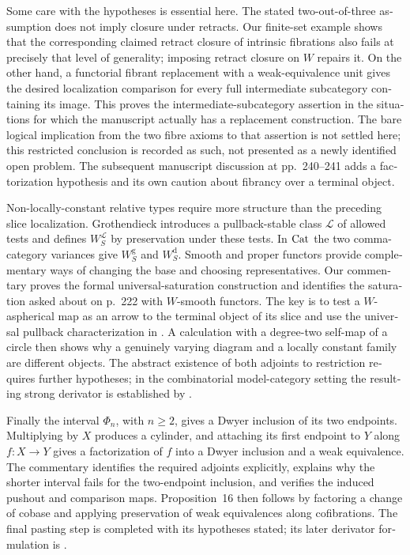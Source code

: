 \begin{otherlanguage}{english}
Some care with the hypotheses is essential here. The stated two-out-of-three assumption does not imply closure under retracts. Our finite-set example shows that the corresponding claimed retract closure of intrinsic fibrations also fails at precisely that level of generality; imposing retract closure on $W$ repairs it. On the other hand, a functorial fibrant replacement with a weak-equivalence unit gives the desired localization comparison for every full intermediate subcategory containing its image. This proves the intermediate-subcategory assertion in the situations for which the manuscript actually has a replacement construction. The bare logical implication from the two fibre axioms to that assertion is not settled here; this restricted conclusion is recorded as such, not presented as a newly identified open problem. The subsequent manuscript discussion at pp.~240--241 adds a factorization hypothesis and its own caution about fibrancy over a terminal object.

Non-locally-constant relative types require more structure than the preceding slice localization. Grothendieck introduces a pullback-stable class $\mathcal L$ of allowed tests and defines $W_S^{\mathcal L}$ by preservation under these tests. In $\mathrm{Cat}$ the two comma-category variances give $W_S^{\mathrm g}$ and $W_S^{\mathrm d}$. Smooth and proper functors provide complementary ways of changing the base and choosing representatives. Our commentary proves the formal universal-saturation construction and identifies the saturation asked about on p.~222 with $W$-smooth functors. The key is to test a $W$-aspherical map as an arrow to the terminal object of its slice and use the universal pullback characterization in \citet[Theorem~1.2(c)]{Maltsiniotis2005Asphericite}. A calculation with a degree-two self-map of a circle then shows why a genuinely varying diagram and a locally constant family are different objects. The abstract existence of both adjoints to restriction requires further hypotheses; in the combinatorial model-category setting the resulting strong derivator is established by \citet[Proposition~1.30]{Groth2013}.

Finally the interval $\Phi_n$, with $n\geq2$, gives a Dwyer inclusion of its two endpoints. Multiplying by $X$ produces a cylinder, and attaching its first endpoint to $Y$ along $f:X\to Y$ gives a factorization of $f$ into a Dwyer inclusion and a weak equivalence. The commentary identifies the required adjoints explicitly, explains why the shorter interval fails for the two-endpoint inclusion, and verifies the induced pushout and comparison maps. Proposition~16 then follows by factoring a change of cobase and applying preservation of weak equivalences along cofibrations. The final pasting step is completed with its hypotheses stated; its later derivator formulation is \citet[Proposition~3.13]{Groth2013}.


\end{otherlanguage}
